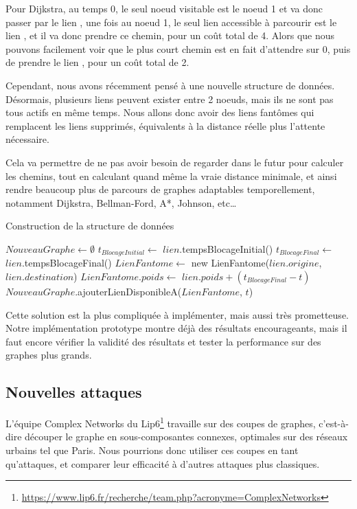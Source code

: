 Pour Dijkstra, au temps 0, le seul noeud visitable est le noeud 1 et va donc passer par le lien , une fois au noeud 1, le seul lien accessible à parcourir est le lien , et il va donc prendre ce chemin, pour un coût total de 4.
Alors que nous pouvons facilement voir que le plus court chemin est en fait d'attendre sur 0, puis de prendre le lien , pour un coût total de 2.

Cependant, nous avons récemment pensé à une nouvelle structure de données.
Désormais, plusieurs liens peuvent exister entre 2 noeuds, mais ils ne sont pas tous actifs en même temps.
Nous allons donc avoir des liens fantômes qui remplacent les liens supprimés, équivalents à la distance réelle plus l'attente nécessaire.

Cela va permettre de ne pas avoir besoin de regarder dans le futur pour calculer les chemins, tout en calculant quand même la vraie distance minimale,
et ainsi rendre beaucoup plus de parcours de graphes adaptables temporellement, notamment Dijkstra, Bellman-Ford, A*, Johnson, etc\dots

\begin{algorithm}[H]
\caption{Construction de la structure de données}
\begin{algorithmic}
\State $NouveauGraphe \gets \emptyset$
    \State $t_{BlocageInitial} \gets$ $lien$.tempsBlocageInitial()
    \State $t_{BlocageFinal} \gets$ $lien$.tempsBlocageFinal()
        \State $LienFantome \gets$ new LienFantome($lien.origine$, $lien.destination$)
        \State $LienFantome.poids \gets$ $lien.poids + (t_{BlocageFinal} - t)$
        \State $NouveauGraphe$.ajouterLienDisponibleA($LienFantome$, $t$)
    \EndFor
\EndFor
\end{algorithmic}
\end{algorithm}

Cette solution est la plus compliquée à implémenter, mais aussi très prometteuse.
Notre implémentation prototype montre déjà des résultats encourageants, mais il faut encore vérifier la validité des résultats et tester la performance sur des graphes plus grands.

\subsection{Nouvelles attaques}\label{subsec:nouvelles_attaques}
L'équipe Complex Networks du Lip6\footnote{\url{https://www.lip6.fr/recherche/team.php?acronyme=ComplexNetworks}} travaille sur des coupes de graphes, c'est-à-dire découper le graphe en sous-composantes connexes, optimales sur des réseaux urbains tel que Paris.
Nous pourrions donc utiliser ces coupes en tant qu'attaques, et comparer leur efficacité à d'autres attaques plus classiques.

